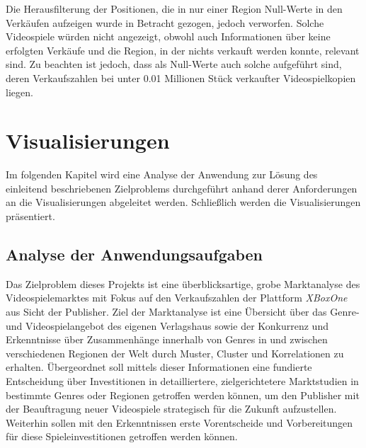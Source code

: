 \documentclass[usegeometry=true]{scrartcl}
\begin{document}
Die Herausfilterung der Positionen, die in nur einer Region Null-Werte in den Verkäufen aufzeigen wurde in Betracht gezogen, jedoch verworfen.
Solche Videospiele würden nicht angezeigt, obwohl auch Informationen über keine erfolgten Verkäufe und die Region, in der nichts verkauft werden konnte, relevant sind. 
Zu beachten ist jedoch, dass als Null-Werte auch solche aufgeführt sind, deren Verkaufszahlen bei unter 0.01 Millionen Stück verkaufter Videospielkopien liegen. 

\section{Visualisierungen}
Im folgenden Kapitel wird eine Analyse der Anwendung zur Lösung des einleitend beschriebenen Zielproblems durchgeführt anhand derer Anforderungen an die Visualisierungen abgeleitet werden. 
Schließlich werden die Visualisierungen präsentiert.

\subsection{Analyse der Anwendungsaufgaben}
Das Zielproblem dieses Projekts ist eine überblicksartige, grobe Marktanalyse des Videospielemarktes mit Fokus auf den Verkaufszahlen der Plattform \textit{XBoxOne} aus Sicht der Publisher.
Ziel der Marktanalyse ist eine Übersicht über das Genre- und Videospielangebot des eigenen Verlagshaus sowie der Konkurrenz und Erkenntnisse über Zusammenhänge innerhalb von Genres in und zwischen verschiedenen Regionen der Welt durch Muster, Cluster und Korrelationen zu erhalten.
Übergeordnet soll mittels dieser Informationen eine fundierte Entscheidung über Investitionen in detailliertere, zielgerichtetere Marktstudien in bestimmte Genres oder Regionen getroffen werden können, um den Publisher mit der Beauftragung neuer Videospiele strategisch für die Zukunft aufzustellen. 
Weiterhin sollen mit den Erkenntnissen erste Vorentscheide und Vorbereitungen für diese Spieleinvestitionen getroffen werden können.
\end{document}
